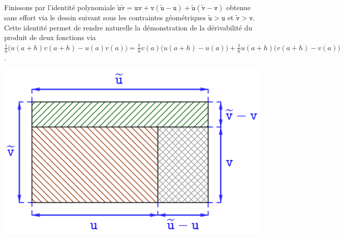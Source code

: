 \begin{example}
    Finissons par l'identité polynomiale
    $ \widetilde{\mathtt{u}} \widetilde{\mathtt{v}}
    = \mathtt{u} \mathtt{v}
    + \mathtt{v} ( \widetilde{\mathtt{u}} - \mathtt{u} )
    + \widetilde{\mathtt{u}} ( \widetilde{\mathtt{v}} - \mathtt{v} )$
    obtenue sans effort via le dessin suivant sous les contraintes géométriques
    $\widetilde{\mathtt{u}} > \mathtt{u}$
    et
    $\widetilde{\mathtt{v}} > \mathtt{v}$.
    Cette identité permet de rendre naturelle la démonstration de la dérivabilité du produit de deux fonctions via
    $ \frac{1}{h} \big( u(a+h) v(a+h) - u(a) v(a) \big)
    = \frac{1}{h} v(a) \big( u(a+h) - u(a) \big)
    + \frac{1}{h} u(a+h) \big( v(a+h) - v(a) \big)$.

	\begin{center}
		\includegraphics[scale=.75]{proder.png}
	\end{center}
\end{example}
